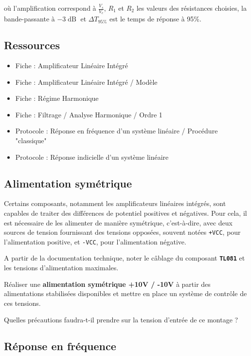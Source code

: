 où l'amplification correspond à $\frac{V_s}{V_e}$, $R_1$ et $R_2$ les valeurs des résistances choisies, la bande-passante à $-3\operatorname{dB}$ et $\Delta{}T_{95\%}$ est le temps de réponse à 95\%.



\subsection{Ressources}

\begin{itemize}
	\item Fiche : Amplificateur Linéaire Intégré
	\item Fiche : Amplificateur Linéaire Intégré / Modèle
	\item Fiche : Régime Harmonique
	\item Fiche : Filtrage / Analyse Harmonique / Ordre 1
	\item Protocole : Réponse en fréquence d'un système linéaire / Procédure "classique"
	\item Protocole : Réponse indicielle d'un système linéaire
\end{itemize}


\clearpage
\subsection{Alimentation symétrique}
Certains composants, notamment les amplificateurs linéaires intégrés, sont capables de traiter des différences de potentiel positives et négatives. Pour cela, il est nécessaire de les alimenter de manière symétrique, c'est-à-dire, avec deux sources de tension fournissant des tensions opposées, souvent notées \texttt{+VCC}, pour l'alimentation positive, et \texttt{-VCC}, pour l'alimentation négative. 

\Quest A partir de la documentation technique, noter le câblage du composant \textbf{\texttt{TL081}} et les tensions d'alimentation maximales. 

\Manip Réaliser une \textbf{alimentation symétrique +10V / -10V} à partir des alimentations stabilisées disponibles et mettre en place un système de contrôle de ces tensions.

\Quest Quelles précautions faudra-t-il prendre sur la tension d'entrée de ce montage ?

\subsection{Réponse en fréquence}


